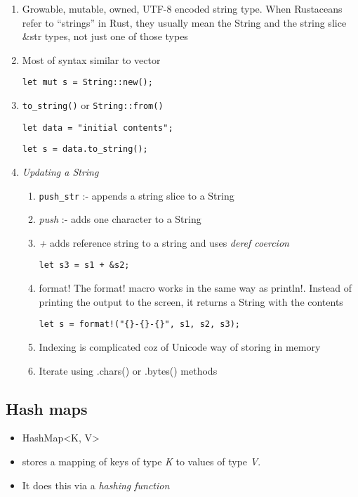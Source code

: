 \documentclass[11pt]{article}
\begin{document}
\begin{enumerate}
\item Growable, mutable, owned, UTF-8 encoded string type.
When Rustaceans refer to “strings” in Rust, 
they usually mean the String and the string slice \&str types, not just one of those types

\item Most of syntax similar to vector

\verb~let mut s = String::new();~

\item \verb~to_string()~  or \verb~String::from()~

\verb~let data = "initial contents";~

\verb~let s = data.to_string();~

\item \emph{Updating a String}

\begin{enumerate}
\item \verb~push_str~ :- appends a string slice to a String

\item \emph{push} :- adds one character to a String

\item \emph{+} adds reference string to a string 
and uses \emph{deref coercion} 

\verb~let s3 = s1 + &s2;~

\item format!
The format! macro works in the same way as println!.
Instead of printing the output to the screen, it returns a String with the contents

\verb~let s = format!("{}-{}-{}", s1, s2, s3);~

\item Indexing is complicated coz of Unicode way of storing in memory

\item Iterate using .chars() or .bytes() methods
\end{enumerate}
\end{enumerate}


\subsection{Hash maps}
\label{sec-13-3}

\begin{itemize}
\item HashMap<K, V>

\item stores a mapping of keys of type \emph{K} to values of type \emph{V}.

\item It does this via a \emph{hashing function}
\end{itemize}
\end{document}
